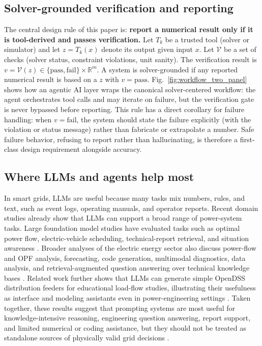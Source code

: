 \documentclass[journal,onecolumn]{IEEEtran} %
\newcommand{\dani}[1]{\color{blue}#1\color{black}}
\begin{document}
\subsection{Solver-grounded verification and reporting}
The central design rule of this paper is: \textbf{report a numerical result only if it is tool-derived and passes verification.} Let $T_k$ be a trusted tool (solver or simulator) and let $z = T_k(x)$  denote its output given input $x$. Let $\mathcal{V}$ be a set of  checks (solver status, constraint violations, unit sanity). The  verification result is $v = \mathcal{V}(z) \in \{\text{pass},\text{fail}\} \times \mathbb{R}^m$. A system is solver-grounded if any reported numerical result is based  on a $z$ with $v = \text{pass}$. Fig.~\ref{fig:workflow_two_panel} shows how an agentic AI layer wraps the canonical solver-centered workflow: the agent orchestrates tool calls and may iterate on failure, but the verification gate is never bypassed before reporting. This rule has a direct corollary for failure handling: when $v = \text{fail}$, the system should state the failure explicitly (with the violation or status message) rather than fabricate or extrapolate a number. Safe failure behavior,  refusing to report rather than hallucinating, is therefore a first-class design requirement alongside accuracy.


\subsection{Where LLMs and agents help most}
{In smart grids, LLMs are useful because many tasks mix numbers, rules, and text, such as event logs, operating manuals, and operator reports. Recent domain studies already show that LLMs can support a broad range of power-system tasks. Large foundation model studies have evaluated tasks such as optimal power flow, electric-vehicle scheduling, technical-report retrieval, and situation awareness \cite{huang2024foundation}. Broader analyses of the electric energy sector also discuss power-flow and OPF analysis, forecasting, code generation, multimodal diagnostics, data analysis, and retrieval-augmented question answering over technical knowledge bases \cite{majumder2024electric}. Related work further shows that LLMs can generate simple OpenDSS distribution feeders for educational load-flow studies, illustrating their usefulness as interface and modeling assistants even in power-engineering settings \cite{bonadia2023potential}. Taken together, these results suggest that prompting systems are most useful for knowledge-intensive reasoning, engineering question answering, report support, and limited numerical or coding assistance, but they should not be treated as standalone sources of physically valid grid decisions \cite{huang2024foundation,majumder2024electric}.}
\end{document}

